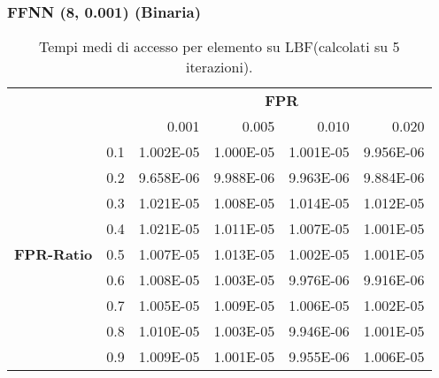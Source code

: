 \documentclass[4apaper,11pt]{report}
\begin{document}
    \subsubsection{FFNN (8, 0.001) (Binaria)}

    \begin{table}[H]
        \centering
        \begin{tabular}{llrrrr}
        \toprule
        {} & & \multicolumn{4}{c}{\textbf{FPR}}\\
        {} & &    0.001 &     0.005 &     0.010 &     0.020 \\
        \midrule
        \multirow{9}{*}{\textbf{FPR-Ratio}} & 0.1& 1.002E-05 & 1.000E-05 & 1.001E-05 & 9.956E-06 \\
        &0.2& 9.658E-06 & 9.988E-06 & 9.963E-06 & 9.884E-06 \\
        &0.3& 1.021E-05 & 1.008E-05 & 1.014E-05 & 1.012E-05 \\
        &0.4& 1.021E-05 & 1.011E-05 & 1.007E-05 & 1.001E-05 \\
        &0.5& 1.007E-05 & 1.013E-05 & 1.002E-05 & 1.001E-05 \\
        &0.6& 1.008E-05 & 1.003E-05 & 9.976E-06 & 9.916E-06 \\
        &0.7& 1.005E-05 & 1.009E-05 & 1.006E-05 & 1.002E-05 \\
        &0.8& 1.010E-05 & 1.003E-05 & 9.946E-06 & 1.001E-05 \\
        &0.9& 1.009E-05 & 1.001E-05 & 9.955E-06 & 1.006E-05 \\
        \bottomrule
        \end{tabular}
        \caption{Tempi medi di accesso per elemento su LBF(calcolati su 5 iterazioni).}
    \end{table}
\end{document}
